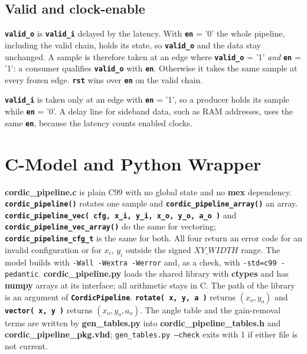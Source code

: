 \documentclass[a4paper, 12pt, notitlepage]{report}
\newcommand{\file}[1]{\textbf{#1}}
\newcommand{\signal}[1]{{\textbf{\tt#1}}}
\begin{document}
\subsection{Valid and clock-enable}
\signal{valid\_o} is \signal{valid\_i} delayed by the latency. With \signal{en} = '0' the whole pipeline, including the
valid chain, holds its state, so \signal{valid\_o} and the data stay unchanged. A sample is
therefore taken at an edge where \signal{valid\_o} = '1' \emph{and} \signal{en} = '1': a consumer qualifies
\signal{valid\_o} with \signal{en}. Otherwise it takes the same sample at every frozen edge.
\signal{rst} wins over \signal{en} on the valid chain.

\signal{valid\_i} is taken only at an edge with \signal{en} = '1', so a producer holds its sample
while \signal{en} = '0'. A delay line for sideband data, such as RAM addresses, uses the same
\signal{en}, because the latency counts enabled clocks.

\section{C-Model and Python Wrapper}
\file{cordic\_pipeline.c} is plain C99 with no global state and no \file{mex} dependency.
\signal{cordic\_pipeline()} rotates one sample and \signal{cordic\_pipeline\_array()} an array.
\signal{cordic\_pipeline\_vec( cfg, x\_i, y\_i, x\_o, y\_o, a\_o )} and \signal{cordic\_pipeline\_vec\_array()}
do the same for vectoring; \signal{cordic\_pipeline\_cfg\_t} is the same for both. All four return an error code for an invalid configuration or for $x_i$, $y_i$ outside the signed
$XY\_WIDTH$ range. The model builds with \texttt{-Wall -Wextra -Werror} and, as a
check, with \texttt{-std=c99 -pedantic}.
\file{cordic\_pipeline.py} loads the shared library with \file{ctypes} and has \file{numpy}
arrays at its interface; all arithmetic stays in C. The path of the library is an argument of
\signal{CordicPipeline}. \signal{rotate( x, y, a )} returns $(x_o, y_o)$ and
\signal{vector( x, y )} returns $(x_o, y_o, a_o)$. The angle table and the gain-removal terms are written by
\file{gen\_tables.py} into \file{cordic\_pipeline\_tables.h} and \file{cordic\_pipeline\_pkg.vhd};
\texttt{gen\_tables.py --check} exits with 1 if either file is not current.
\end{document}

